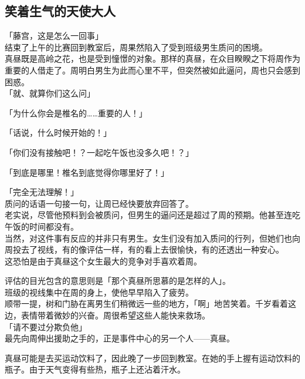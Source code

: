\subsection{笑着生气的天使大人}

「藤宫，这是怎么一回事」\\

结束了上午的比赛回到教室后，周果然陷入了受到班级男生质问的困境。\\

真昼既是高岭之花，也是受到憧憬的对象。那样的真昼，在众目睽睽之下将周作为重要的人借走了。周明白男生为此而心里不平，但突然被如此逼问，周也只会感到困惑。\\

「就、就算你们这么问」

「为什么你会是椎名的……重要的人！」

「话说，什么时候开始的！」

「你们没有接触吧！？一起吃午饭也没多久吧！？」

「到底是哪里！椎名到底觉得你哪里好了！」

「完全无法理解！」\\

质问的话语一句接一句，让周已经快要放弃回答了。\\

老实说，尽管他预料到会被质问，但男生的逼问还是超过了周的预期。他甚至连吃午饭的时间都没有。\\

当然，对这件事有反应的并非只有男生。女生们没有加入质问的行列，但她们也向周投去了视线，有的像评估一样，有的看上去很愉快，有的还透出一种安心。\\

这恐怕是由于真昼这个女生最大的竞争对手喜欢着周。

评估的目光包含的意思则是「那个真昼所思慕的是怎样的人」。\\

班级的视线集中在周的身上，使他早早陷入了疲劳。\\

顺带一提，树和门胁在离男生们稍微远一些的地方，「啊」地苦笑着。千岁看着这边，表情带着微妙的兴奋。周很希望这些人能快来救场。\\

「请不要过分欺负他」\\

最先向周伸出援助之手的，正是事件中心的另一个人——真昼。

真昼可能是去买运动饮料了，因此晚了一步回到教室。在她的手上握有运动饮料的瓶子。由于天气变得有些热，瓶子上还沾着汗水。\\


